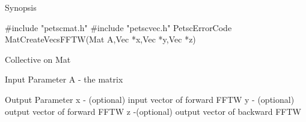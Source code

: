 Synopsis

#include "petscmat.h" 
#include "petscvec.h"   
PetscErrorCode MatCreateVecsFFTW(Mat A,Vec *x,Vec *y,Vec *z)

Collective on Mat

Input Parameter
A - the matrix

Output Parameter
x - (optional) input vector of forward FFTW
y - (optional) output vector of forward FFTW
z -(optional) output vector of backward FFTW 
